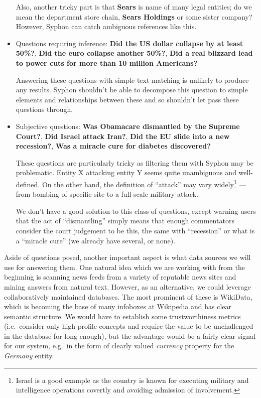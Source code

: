 \documentclass[11pt,a4paper]{article}
\begin{document}
\begin{itemize}
		Also, another tricky part is that \textbf{Sears} is name
		of many legal entities; do we mean the department store
		chain, \textbf{Sears Holdings} or some sister company?
		However, Syphon can catch ambiguous references like this.

	\item Questions requiring inference: \textbf{Did the US dollar collapse by at least 50\%?},
		\textbf{Did the euro collapse another 50\%?},
		\textbf{Did a real blizzard lead to power cuts for more than 10 million Americans?}

		Answering these questions with simple text matching
		is unlikely to produce any results.  Syphon shouldn't
		be able to decompose this question to simple elements
		and relationships between these and so shouldn't let
		pass these questions through.

	\item Subjective questions: \textbf{Was Obamacare dismantled by the Supreme Court?},
		\textbf{Did Israel attack Iran?},
		\textbf{Did the EU slide into a new recession?},
		\textbf{Was a miracle cure for diabetes discovered?}

		These questions are particularly tricky as filtering
		them with Syphon may be problematic.  Entity X attacking
		entity Y seems quite unambiguous and well-defined.
		On the other hand, the definition of ``attack'' may
		vary widely\footnote{Israel is a good example as the country is known for executing military and intelligence operations covertly and avoiding admission of involvement.} --- from bombing of specific site
		to a full-scale military attack.

		We don't have a good solution to this class of questions,
		except warning users that the act of ``dismantling''
		simply means that enough commentators consider the court
		judgement to be this, the same with ``recession'' or what
		is a ``miracle cure'' (we already have several, or none).
\end{itemize}

Aside of questions posed, another important aspect is what data sources
we will use for answering them.  One natural idea which we are working
with from the beginning is scanning news feeds from a variety of reputable
news sites and mining answers from natural text.
However, as an alternative, we could leverage collaboratively maintained
databases.  The most prominent of these is WikiData, which is becoming the
base of many infoboxes at Wikipedia and has clear semantic structure.
We would have to establish some trustworthiness metrics (i.e.\ consider
only high-profile concepts and require the value to be unchallenged in
the database for long enough), but the advantage would be a fairly clear
signal for our system, e.g.\ in the form of clearly valued \textit{currency}
property for the \textit{Germany} entity.
\end{document}
